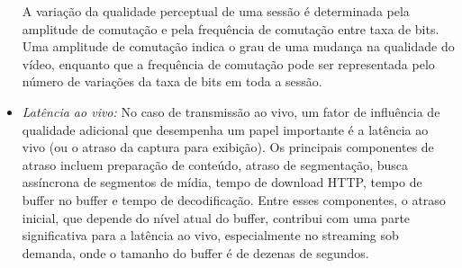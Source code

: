 \begin{itemize}
A variação da qualidade perceptual de uma sessão é determinada pela amplitude de comutação e pela frequência de comutação entre taxa de bits. 
Uma amplitude de comutação indica o grau de uma mudança na qualidade do vídeo, enquanto que a frequência de comutação pode ser representada pelo número de variações da taxa de bits em toda a sessão.
\vspace{-0.05cm}
\item \textit{Latência ao vivo:} No caso de transmissão ao vivo, um fator de influência de qualidade adicional que desempenha um papel importante é a latência ao vivo (ou o atraso da captura para exibição). Os principais componentes de atraso incluem preparação de conteúdo, atraso de segmentação, busca assíncrona de segmentos de mídia, tempo de download HTTP, tempo de buffer no buffer e tempo de decodificação. Entre esses componentes, o atraso inicial, que depende do nível atual do buffer, contribui com uma parte significativa para a latência ao vivo, especialmente no streaming sob demanda, onde o tamanho do buffer é de dezenas de segundos.

\end{itemize}

